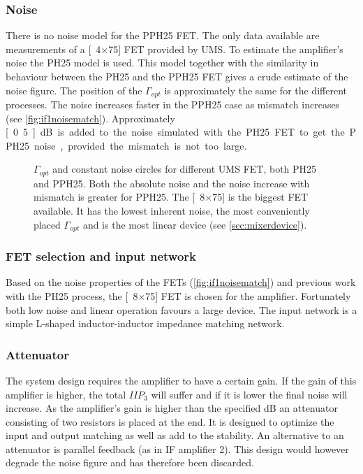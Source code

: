			\subsubsection{Noise}\label{sec:if1noise}
				There is no noise model for the PPH25 FET. The only data available are measurements of a \unit[4$\times$75]{\mum} FET provided by UMS. To estimate the amplifier's noise the PH25 model is used. This model together with the similarity in behaviour between the PH25 and the PPH25 FET gives a crude estimate of the noise figure. The position of the $\Gamma_{opt}$ is approximately the same for the different processes. The noise increases faster in the PPH25 case as mismatch increases (see \autoref{fig:if1noisematch}). Approximately \unit[0.5]{dB} is added to the noise simulated with the PH25 FET to get the PPH25 noise, provided the mismatch is not too large.

			\begin{figure}[hbt!]
				\centering
				\caption[$\Gamma_{opt}$ and constant noise circles for UMS FETs.]{$\Gamma_{opt}$ and constant noise circles for different UMS FET, both PH25 and PPH25. Both the absolute noise and the noise increase with mismatch is greater for PPH25. The \unit[8$\times$75]{\mum} is the biggest FET available. It has the lowest inherent noise, the most conveniently placed $\Gamma_{opt}$ and is the most linear device (see \autoref{sec:mixerdevice}).}\label{fig:if1noisematch}
			\end{figure}

			\subsubsection{FET selection and input network}
				Based on the noise properties of the FETs (\autoref{fig:if1noisematch}) and previous work with the PH25 process\autocite{gustavsson07}, the \unit[8$\times$75]{\mum} FET is chosen for the amplifier. Fortunately both low noise and linear operation favours a large device. The input network is a simple L-shaped inductor-inductor impedance matching network.

			\subsubsection{Attenuator}
				The system design requires the amplifier to have a certain gain. If the gain of this amplifier is higher, the total $IIP_3$ will suffer and if it is lower the final noise will increase. As the amplifier's gain is higher than the specified \unit[12]{dB} an attenuator consisting of two resistors is placed at the end. It is designed to optimize the input and output matching as well as add to the stability.\autocite{delpy06} An alternative to an attenuator is parallel feedback (as in IF amplifier 2). This design would however degrade the noise figure and has therefore been discarded.

